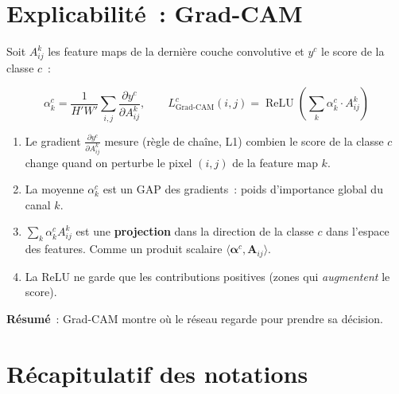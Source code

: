\documentclass[11pt,a4paper]{article}
\DeclareMathOperator{\ReLU}{ReLU}
\begin{document}
\section{Explicabilit\'e~: Grad-CAM}

Soit $A^k_{ij}$ les feature maps de la derni\`ere couche convolutive et $y^c$ le score de la classe $c$~:

\begin{equation}
  \alpha_k^c = \frac{1}{H'W'}\sum_{i,j} \frac{\partial y^c}{\partial A^k_{ij}}, \qquad
  \boxed{L^c_{\text{Grad-CAM}}(i,j) = \ReLU\!\left(\sum_k \alpha_k^c \cdot A^k_{ij}\right)}
\end{equation}

\begin{intubox}
\begin{enumerate}[leftmargin=1.5em]
  \item Le gradient $\frac{\partial y^c}{\partial A^k_{ij}}$ mesure (r\`egle de cha\^ine, L1) combien le score de la classe $c$ change quand on perturbe le pixel $(i,j)$ de la feature map $k$.

  \item La moyenne $\alpha_k^c$ est un GAP des gradients~: poids d'importance global du canal $k$.

  \item $\sum_k \alpha_k^c A^k_{ij}$ est une \textbf{projection} dans la direction de la classe $c$ dans l'espace des features. Comme un produit scalaire $\langle \bm{\alpha}^c, \mathbf{A}_{ij} \rangle$.

  \item La ReLU ne garde que les contributions positives (zones qui \emph{augmentent} le score).
\end{enumerate}

\textbf{R\'esum\'e}~: Grad-CAM montre \og{}o\`u le r\'eseau regarde\fg{} pour prendre sa d\'ecision.
\end{intubox}

\section{R\'ecapitulatif des notations}
\end{document}
